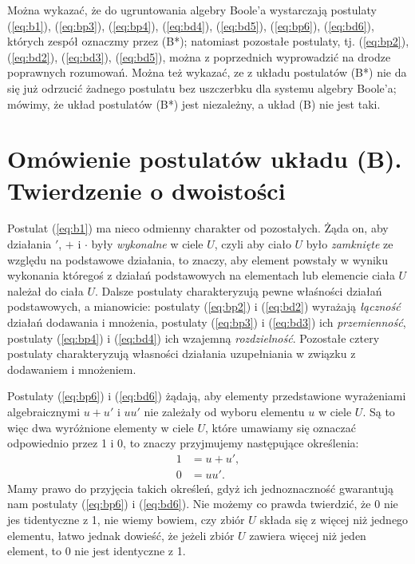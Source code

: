 \documentclass[12 pt, a4paper, leqno]{book}
\numberwithin{equation}{section}
\newcommand{\refb}[1]{(\ref{#1})}
\begin{document}
Można wykazać, że do ugruntowania algebry Boole'a wystarczają postulaty \refb{eq:b1}, \refb{eq:bp3}, \refb{eq:bp4},
\refb{eq:bd4}, \refb{eq:bd5}, \refb{eq:bp6}, \refb{eq:bd6}, których zespół oznaczmy przez (B*); natomiast pozostałe
postulaty, tj. \refb{eq:bp2}, \refb{eq:bd2}, \refb{eq:bd3}, \refb{eq:bd5}, można z poprzednich wyprowadzić na drodze poprawnych
rozumowań. Można też wykazać, ze z układu postulatów (B*) nie da się już odrzucić żadnego postulatu bez uszczerbku dla systemu algebry Boole'a;
mówimy, że układ postulatów (B*) jest niezależny, a układ (B) nie jest taki.

\section{Omówienie postulatów układu (B). Twierdzenie o dwoistości} \label{sec:dwoistosc}
Postulat \refb{eq:b1} ma nieco odmienny charakter od pozostałych. Żąda on, aby działania
$'$, $+$ i $\cdot$ były \textit{wykonalne} w ciele $U$, czyli aby ciało $U$ było \textit{zamknięte}
ze względu na podstawowe działania, to znaczy, aby element powstały w wyniku wykonania któregoś
 z działań podstawowych na elementach lub elemencie ciała $U$ należał do ciała $U$. Dalsze
 postulaty charakteryzują pewne właśności działań podstawowych, a mianowicie:
 postulaty \refb{eq:bp2} i \refb{eq:bd2} wyrażają \textit{łączność} działań dodawania i mnożenia,
 postulaty \refb{eq:bp3} i \refb{eq:bd3} ich \textit{przemienność}, postulaty \refb{eq:bp4} i \refb{eq:bd4}
 ich wzajemną \textit{rozdzielność}. Pozostałe cztery postulaty charakteryzują własności
 działania uzupełniania w związku z dodawaniem i mnożeniem.

 Postulaty \refb{eq:bp6} i \refb{eq:bd6} żądają, aby elementy przedstawione wyrażeniami algebraicznymi $u+u'$ i $uu'$
 nie zależały od wyboru elementu $u$ w ciele $U$. Są to więc dwa wyróżnione elementy w ciele $U$, które umawiamy się oznaczać
 odpowiednio przez 1 i 0, to znaczy przyjmujemy następujące określenia:
 \begin{align}
  1 &= u + u',  \label{eq:jedynka} \\ 
  0 &= uu'.  \label{eq:zero}
 \end{align}
 Mamy prawo do przyjęcia takich określeń, gdyż ich jednoznaczność gwarantują nam postulaty 
 \refb{eq:bp6} i \refb{eq:bd6}. Nie możemy co prawda twierdzić, że 0 nie jes tidentyczne z 1,
 nie wiemy bowiem, czy zbiór $U$ składa się z więcej niż jednego elementu, łatwo jednak dowieść,
 że jeżeli zbiór $U$ zawiera więcej niż jeden element, to 0 nie jest identyczne z 1.
\end{document}
